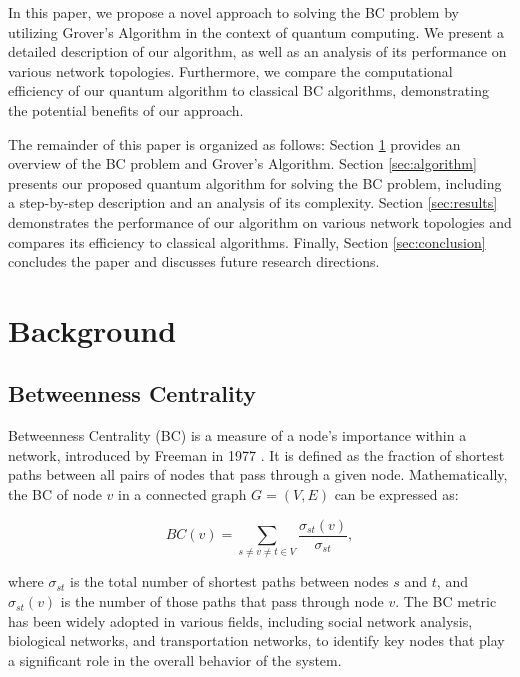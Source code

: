 In this paper, we propose a novel approach to solving the BC problem by utilizing Grover's Algorithm in the context of quantum computing. We present a detailed description of our algorithm, as well as an analysis of its performance on various network topologies. Furthermore, we compare the computational efficiency of our quantum algorithm to classical BC algorithms, demonstrating the potential benefits of our approach.

The remainder of this paper is organized as follows: Section \ref{sec:background} provides an overview of the BC problem and Grover's Algorithm. Section \ref{sec:algorithm} presents our proposed quantum algorithm for solving the BC problem, including a step-by-step description and an analysis of its complexity. Section \ref{sec:results} demonstrates the performance of our algorithm on various network topologies and compares its efficiency to classical algorithms. Finally, Section \ref{sec:conclusion} concludes the paper and discusses future research directions.

\section{Background}\label{sec:background}

\subsection{Betweenness Centrality}

Betweenness Centrality (BC) is a measure of a node's importance within a network, introduced by Freeman in 1977 \cite{Freeman1977}. It is defined as the fraction of shortest paths between all pairs of nodes that pass through a given node. Mathematically, the BC of node $v$ in a connected graph $G=(V,E)$ can be expressed as:

\begin{equation}\label{eq:BC}
BC(v) = \sum_{s \neq v \neq t \in V} \frac{\sigma_{st}(v)}{\sigma_{st}},
\end{equation}

\noindent where $\sigma_{st}$ is the total number of shortest paths between nodes $s$ and $t$, and $\sigma_{st}(v)$ is the number of those paths that pass through node $v$. The BC metric has been widely adopted in various fields, including social network analysis, biological networks, and transportation networks, to identify key nodes that play a significant role in the overall behavior of the system.

